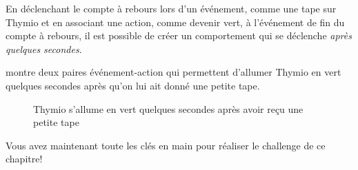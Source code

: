 En déclenchant le compte à rebours lors d'un événement, comme une tape sur Thymio et en associant une action, comme devenir vert, à l'événement de fin du compte à rebours, il est possible de créer un comportement qui se déclenche \textit{après quelques secondes}.

 montre deux paires événement-action qui permettent d'allumer Thymio en vert quelques secondes après qu'on lui ait donné une petite tape.

\begin{figure}
\begin{center}
\caption{Thymio s'allume en vert quelques secondes après avoir reçu une petite tape}\label{fig.paire-timer}
\end{center}
\end{figure}

Vous avez maintenant toute les clés en main pour réaliser le challenge de ce chapitre!
